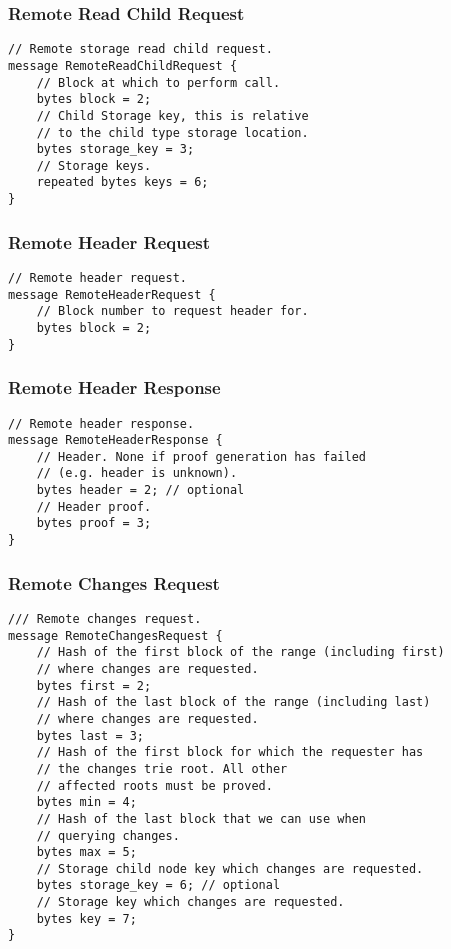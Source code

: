\documentclass{book}
\begin{document}
\subsubsection{Remote Read Child Request}

\begin{lstlisting}[frame=single]
// Remote storage read child request.
message RemoteReadChildRequest {
	// Block at which to perform call.
	bytes block = 2;
	// Child Storage key, this is relative
	// to the child type storage location.
	bytes storage_key = 3;
	// Storage keys.
	repeated bytes keys = 6;
}
\end{lstlisting}

\subsubsection{Remote Header Request}

\begin{lstlisting}[frame=single]
// Remote header request.
message RemoteHeaderRequest {
	// Block number to request header for.
	bytes block = 2;
}
\end{lstlisting}

\subsubsection{Remote Header Response}

\begin{lstlisting}[frame=single]
// Remote header response.
message RemoteHeaderResponse {
    // Header. None if proof generation has failed
    // (e.g. header is unknown).
	bytes header = 2; // optional
	// Header proof.
	bytes proof = 3;
}
\end{lstlisting}

\subsubsection{Remote Changes Request}

\begin{lstlisting}[frame=single]
/// Remote changes request.
message RemoteChangesRequest {
    // Hash of the first block of the range (including first)
    // where changes are requested.
	bytes first = 2;
    // Hash of the last block of the range (including last)
    // where changes are requested.
	bytes last = 3;
    // Hash of the first block for which the requester has
    // the changes trie root. All other
	// affected roots must be proved.
	bytes min = 4;
    // Hash of the last block that we can use when
    // querying changes.
	bytes max = 5;
	// Storage child node key which changes are requested.
	bytes storage_key = 6; // optional
	// Storage key which changes are requested.
	bytes key = 7;
}
\end{lstlisting}
\end{document}
